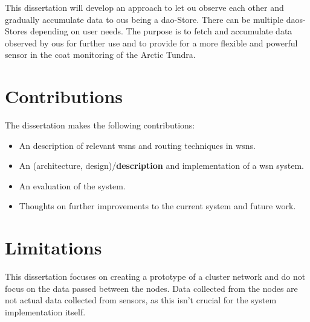 \documentclass[USenglish]{uit-thesis}
\begin{document}
This dissertation will develop an approach to let \gls{ou} observe each other and gradually accumulate data to \glspl{ou} being a \gls{dao}-Store. There can be multiple \glspl{dao}-Stores depending on user needs. The purpose is to fetch and accumulate data observed by \gls{ou}s for further use and to provide for a more flexible and powerful sensor in the \gls{coat} monitoring of the Arctic Tundra.




\section{Contributions}
The dissertation makes the following contributions:

\begin{itemize}
\item An description of relevant \gls{wsn}s and routing techniques in \gls{wsn}s.
\item An (architecture, design)/\textbf{description} and implementation of a \gls{wsn} system.
\item An evaluation of the system.
\item Thoughts on further improvements to the current system and future work.
\end{itemize}



\section{Limitations}
This dissertation focuses on creating a prototype of a cluster network and do not focus on the data passed between the nodes. Data collected from the nodes are not actual data collected from sensors, as this isn't crucial for the system implementation itself.
\end{document}
